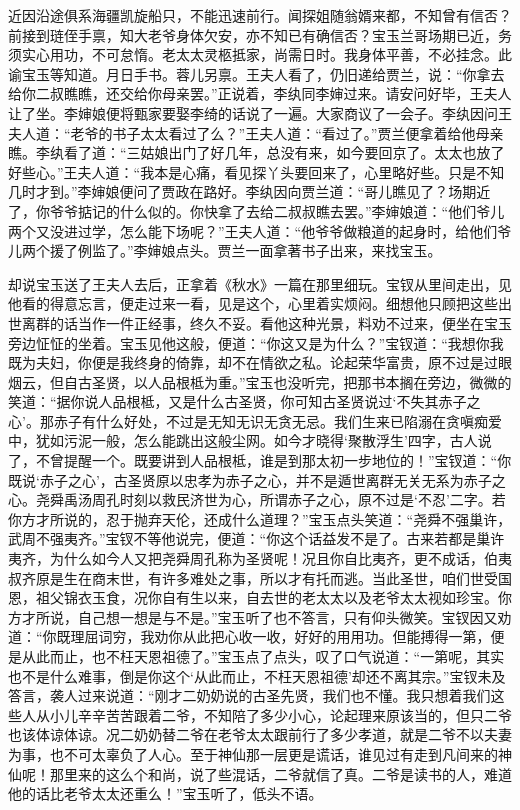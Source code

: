 \begin{parag}
    近因沿途俱系海疆凯旋船只，不能迅速前行。闻探姐随翁婿来都，不知曾有信否？前接到琏侄手禀，知大老爷身体欠安，亦不知已有确信否？宝玉兰哥场期已近，务须实心用功，不可怠惰。老太太灵柩抵家，尚需日时。我身体平善，不必挂念。此谕宝玉等知道。月日手书。蓉儿另禀。王夫人看了，仍旧递给贾兰，说：“你拿去给你二叔瞧瞧，还交给你母亲罢。”正说着，李纨同李婶过来。请安问好毕，王夫人让了坐。李婶娘便将甄家要娶李绮的话说了一遍。大家商议了一会子。李纨因问王夫人道：“老爷的书子太太看过了么？”王夫人道：“看过了。”贾兰便拿着给他母亲瞧。李纨看了道：“三姑娘出门了好几年，总没有来，如今要回京了。太太也放了好些心。”王夫人道：“我本是心痛，看见探丫头要回来了，心里略好些。只是不知几时才到。”李婶娘便问了贾政在路好。李纨因向贾兰道：“哥儿瞧见了？场期近了，你爷爷掂记的什么似的。你快拿了去给二叔叔瞧去罢。”李婶娘道：“他们爷儿两个又没进过学，怎么能下场呢？”王夫人道：“他爷爷做粮道的起身时，给他们爷儿两个援了例监了。”李婶娘点头。贾兰一面拿著书子出来，来找宝玉。
\end{parag}


\begin{parag}
    却说宝玉送了王夫人去后，正拿着《秋水》一篇在那里细玩。宝钗从里间走出，见他看的得意忘言，便走过来一看，见是这个，心里着实烦闷。细想他只顾把这些出世离群的话当作一件正经事，终久不妥。看他这种光景，料劝不过来，便坐在宝玉旁边怔怔的坐着。宝玉见他这般，便道：“你这又是为什么？”宝钗道：“我想你我既为夫妇，你便是我终身的倚靠，却不在情欲之私。论起荣华富贵，原不过是过眼烟云，但自古圣贤，以人品根柢为重。”宝玉也没听完，把那书本搁在旁边，微微的笑道：“据你说人品根柢，又是什么古圣贤，你可知古圣贤说过‘不失其赤子之心’。那赤子有什么好处，不过是无知无识无贪无忌。我们生来已陷溺在贪嗔痴爱中，犹如污泥一般，怎么能跳出这般尘网。如今才晓得‘聚散浮生’四字，古人说了，不曾提醒一个。既要讲到人品根柢，谁是到那太初一步地位的！”宝钗道：“你既说‘赤子之心’，古圣贤原以忠孝为赤子之心，并不是遁世离群无关无系为赤子之心。尧舜禹汤周孔时刻以救民济世为心，所谓赤子之心，原不过是‘不忍’二字。若你方才所说的，忍于抛弃天伦，还成什么道理？”宝玉点头笑道：“尧舜不强巢许，武周不强夷齐。”宝钗不等他说完，便道：“你这个话益发不是了。古来若都是巢许夷齐，为什么如今人又把尧舜周孔称为圣贤呢！况且你自比夷齐，更不成话，伯夷叔齐原是生在商末世，有许多难处之事，所以才有托而逃。当此圣世，咱们世受国恩，祖父锦衣玉食，况你自有生以来，自去世的老太太以及老爷太太视如珍宝。你方才所说，自己想一想是与不是。”宝玉听了也不答言，只有仰头微笑。宝钗因又劝道：“你既理屈词穷，我劝你从此把心收一收，好好的用用功。但能搏得一第，便是从此而止，也不枉天恩祖德了。”宝玉点了点头，叹了口气说道：“一第呢，其实也不是什么难事，倒是你这个‘从此而止，不枉天恩祖德’却还不离其宗。”宝钗未及答言，袭人过来说道：“刚才二奶奶说的古圣先贤，我们也不懂。我只想着我们这些人从小儿辛辛苦苦跟着二爷，不知陪了多少小心，论起理来原该当的，但只二爷也该体谅体谅。况二奶奶替二爷在老爷太太跟前行了多少孝道，就是二爷不以夫妻为事，也不可太辜负了人心。至于神仙那一层更是谎话，谁见过有走到凡间来的神仙呢！那里来的这么个和尚，说了些混话，二爷就信了真。二爷是读书的人，难道他的话比老爷太太还重么！”宝玉听了，低头不语。
\end{parag}


